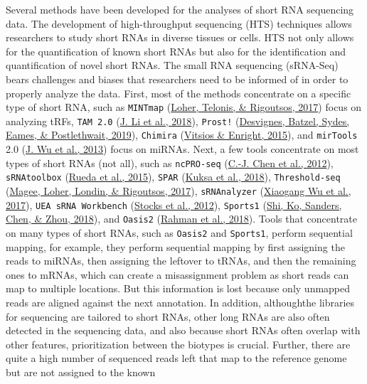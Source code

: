 \documentclass[12pt,twoside]{reedthesis}
\begin{document}
Several methods have been developed for the analyses of short RNA
sequencing data. The development of high-throughput sequencing (HTS)
techniques allows researchers to study short RNAs in diverse tissues or
cells. HTS not only allows for the quantification of known short RNAs
but also for the identification and quantification of novel short RNAs.
The small RNA sequencing (sRNA-Seq) bears challenges and biases that
researchers need to be informed of in order to properly analyze the
data. First, most of the methods concentrate on a specific type of short
RNA, such as \texttt{MINTmap} (\protect\hyperlink{ref-loher2017}{Loher, Telonis, \& Rigoutsos, 2017}) focus on analyzing tRFs, \texttt{TAM\ 2.0}
(\protect\hyperlink{ref-li2018}{J. Li et al., 2018}), \texttt{Prost!} (\protect\hyperlink{ref-desvignes2019}{Desvignes, Batzel, Sydes, Eames, \& Postlethwait, 2019}), \texttt{Chimira} (\protect\hyperlink{ref-vitsios2015}{Vitsios \& Enright, 2015}), and
\texttt{mirTools} 2.0 (\protect\hyperlink{ref-wu2013}{J. Wu et al., 2013}) focus on miRNAs. Next, a few tools concentrate
on most types of short RNAs (not all), such as \texttt{ncPRO-seq} (\protect\hyperlink{ref-chen2012}{C.-J. Chen et al., 2012}),
\texttt{sRNAtoolbox} (\protect\hyperlink{ref-rueda2015}{Rueda et al., 2015}), \texttt{SPAR} (\protect\hyperlink{ref-kuksa2018}{Kuksa et al., 2018}), \texttt{Threshold-seq}
(\protect\hyperlink{ref-magee2017}{Magee, Loher, Londin, \& Rigoutsos, 2017}), \texttt{sRNAnalyzer} (\protect\hyperlink{ref-wu2017}{Xiaogang Wu et al., 2017}), \texttt{UEA\ sRNA\ Workbench}
(\protect\hyperlink{ref-stocks2012}{Stocks et al., 2012}), \texttt{Sports1} (\protect\hyperlink{ref-shi2018}{Shi, Ko, Sanders, Chen, \& Zhou, 2018}), and \texttt{Oasis2} (\protect\hyperlink{ref-rahman2018}{Rahman et al., 2018}). Tools
that concentrate on many types of short RNAs, such as \texttt{Oasis2} and
\texttt{Sports1}, perform sequential mapping, for example, they perform
sequential mapping by first assigning the reads to miRNAs, then
assigning the leftover to tRNAs, and then the remaining ones to mRNAs,
which can create a misassignment problem as short reads can map to
multiple locations. But this information is lost because only unmapped
reads are aligned against the next annotation. In addition, althoughthe
libraries for sequencing are tailored to short RNAs, other long RNAs are
also often detected in the sequencing data, and also because short RNAs
often overlap with other features, prioritization between the biotypes
is crucial. Further, there are quite a high number of sequenced reads
left that map to the reference genome but are not assigned to the known
\end{document}
